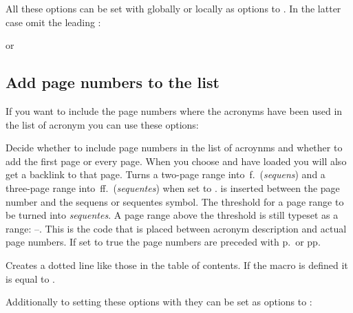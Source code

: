 \documentclass{acro-manual}
\newcommand*\latin[1]{\textit{#1}}
\begin{document}
All these options can be set with  globally or locally as options
to . In the latter case omit the leading
:
\begin{sourcecode}
  or
  \printacronyms[display=all,exclude=units]
\end{sourcecode}

\subsection{Add page numbers to the list}\label{sec:page-numbers}
If you want to include the page numbers where the acronyms have been used in
the list of acronym you can use these options:
\begin{options}
    Decide whether to include page numbers in the list of acroynms and
    whether to add the first page or every page.  When you choose
     and have  loaded you will also get a
    backlink to that page.
    Turns a two-page range into \,f.\ (\latin{sequens}) and a
    three-page range into \,ff.\ (\latin{sequentes}) when set to
    .
  \Default{\cs*{,}}
     is inserted between the page number and the sequens or
    sequentes symbol.
    The threshold for a page range to be turned into \latin{sequentes}.  A
    page range above the threshold is still typeset as a range:
    --.
    This is the code that is placed between acronym description and actual
    page numbers.
    If set to true the page numbers are preceded with p.\ or pp.
\end{options}
\begin{commands}
    Creates a dotted line like those in the table of
    contents.  If the macro  is defined it is equal to
    .
\end{commands}
Additionally to setting these options with  they
can be set as options to :
\begin{sourcecode}
  \printacronyms[pages={display=all,seq/use=false}]
\end{sourcecode}
\end{document}
